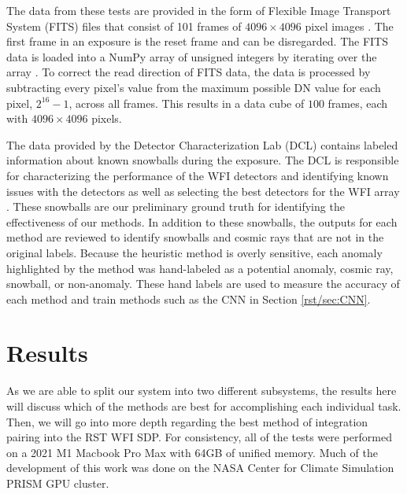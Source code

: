 The data from these tests are provided in the form of Flexible Image Transport System (FITS) files that consist of 101 frames of $4096 \times 4096$ pixel images \parencite{wells1979fits}.
The first frame in an exposure is the reset frame and can be disregarded. 
The FITS data is loaded into a NumPy array of unsigned integers by iterating over the array \parencite{harris2020array}.
To correct the read direction of FITS data, the data is processed by subtracting every pixel's value from the maximum possible DN value for each pixel, $2^{16} - 1$, across all frames.
This results in a data cube of $100$ frames, each with $4096 \times 4096$ pixels. 

The data provided by the Detector Characterization Lab (DCL) contains labeled information about known snowballs during the exposure. 
The DCL is responsible for characterizing the performance of the WFI detectors and identifying known issues with the detectors as well as selecting the best detectors for the WFI array \parencite{Mosby_2020}.
These snowballs are our preliminary ground truth for identifying the effectiveness of our methods. 
In addition to these snowballs, the outputs for each method are reviewed to identify snowballs and cosmic rays that are not in the original labels.
Because the heuristic method is overly sensitive, each anomaly highlighted by the method was hand-labeled as a potential anomaly, cosmic ray, snowball, or non-anomaly. 
These hand labels are used to measure the accuracy of each method and train methods such as the CNN in Section \ref{rst/sec:CNN}.

\section{Results}
\label{rst/sec:results}

As we are able to split our system into two different subsystems, the results here will discuss which of the methods are best for accomplishing each individual task. 
Then, we will go into more depth regarding the best method of integration pairing into the RST WFI SDP. 
For consistency, all of the tests were performed on a 2021 M1 Macbook Pro Max with 64GB of unified memory.
Much of the development of this work was done on the NASA Center for Climate Simulation PRISM GPU cluster. 

